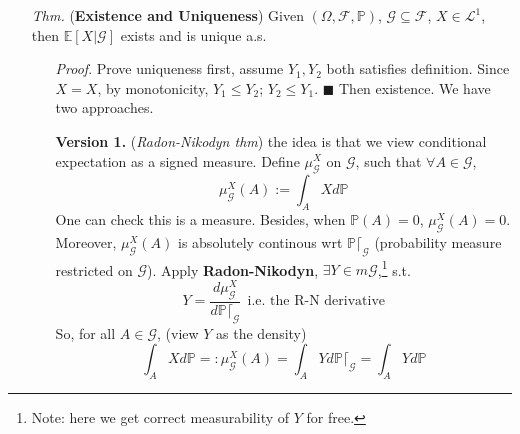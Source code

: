 \documentclass[a4paper,12pt,twoside]{book}
\begin{document}
\begin{itemize}
	\item[\textit{Thm.}] (\textbf{Existence and Uniqueness}) Given $(\Omega, \mathcal{F}, \mathbb{P})$, $\mathcal{G}\subseteq \mathcal{F}$, $X \in \mathcal{L}^1$, then $\mathbb{E}\left[X|\mathcal{G} \right]$ exists and is unique a.s.
	\begin{itemize}
		\item[\textit{Proof}.] Prove uniqueness first, assume $Y_1, Y_2$ both satisfies definition. Since $X=X$, by monotonicity, $Y_1 \leq Y_2$; $Y_2 \leq Y_1$. $\blacksquare$ \newline
		Then existence. We have two approaches. \newline

		\textbf{Version 1.} (\textit{Radon-Nikodyn thm}) the idea is that we view conditional expectation as a signed measure. \newline
		Define $\mu_{\mathcal{G}}^X$ on $\mathcal{G}$, such that $\forall A \in \mathcal{G}$,
		\begin{equation}
			\mu_{\mathcal{G}}^X (A):=\int_A X d\mathbb{P}
		\end{equation}
		One can check this is a measure. Besides, when $\mathbb{P}\left(A\right)=0$, $\mu_{\mathcal{G}}^X (A)=0$. Moreover, $\mu_{\mathcal{G}}^X (A)$ is absolutely continous wrt $\mathbb{P}\lceil_{\mathcal{G}}$ (probability measure restricted on $\mathcal{G}$). Apply \textbf{Radon-Nikodyn}, $\exists Y \in m \mathcal{G}$,\footnote{Note: here we get correct measurability of $Y$ for free.} s.t.
		\begin{equation}
			Y = \frac{d\mu_{\mathcal{G}}^X}{d\mathbb{P}\lceil_{\mathcal{G}}}~~\text{i.e. the R-N derivative}
		\end{equation}
		So, for all $A \in \mathcal{G}$, (view $Y$ as the density)
		\begin{equation}
			\int_A X d\mathbb{P}=:\mu_{\mathcal{G}}^X (A)=\int_{A}Y d\mathbb{P}\lceil_{\mathcal{G}}=\int_{A}Y d\mathbb{P}
		\end{equation}


\end{itemize}
\end{itemize}
\end{document}
